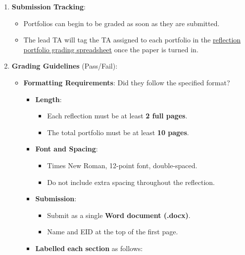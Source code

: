 \documentclass[
]{article}
\providecommand{\tightlist}{%
  \setlength{\itemsep}{0pt}\setlength{\parskip}{0pt}}
\begin{document}
\begin{enumerate}
\def\labelenumi{\arabic{enumi}.}
\item
  \textbf{Submission Tracking}:

  \begin{itemize}
  \tightlist
  \item
    Portfolios can begin to be graded as soon as they are submitted.\\
  \item
    The lead TA will tag the TA assigned to each portfolio in the \href{https://docs.google.com/spreadsheets/d/1Svqi-B-zVCOHV6jpabtC8N3SdY7lGWLxTohlPmq__5k/edit?gid=636250357\#gid=636250357}{reflection portfolio grading spreadsheet} once the paper is turned in.
  \end{itemize}
\item
  \textbf{Grading Guidelines} (Pass/Fail):

  \begin{itemize}
  \tightlist
  \item
    \textbf{Formatting Requirements}: Did they follow the specified format?

    \begin{itemize}
    \tightlist
    \item
      \textbf{Length}:

      \begin{itemize}
      \tightlist
      \item
        Each reflection must be at least \textbf{2 full pages}.\\
      \item
        The total portfolio must be at least \textbf{10 pages}.\\
      \end{itemize}
    \item
      \textbf{Font and Spacing}:

      \begin{itemize}
      \tightlist
      \item
        Times New Roman, 12-point font, double-spaced.\\
      \item
        Do not include extra spacing throughout the reflection.\\
      \end{itemize}
    \item
      \textbf{Submission}:

      \begin{itemize}
      \tightlist
      \item
        Submit as a single \textbf{Word document (.docx)}.\\
      \item
        Name and EID at the top of the first page.\\
      \end{itemize}
    \item
      \textbf{Labelled each section} as follows:


\end{itemize}
\end{itemize}
\end{enumerate}
\end{document}

